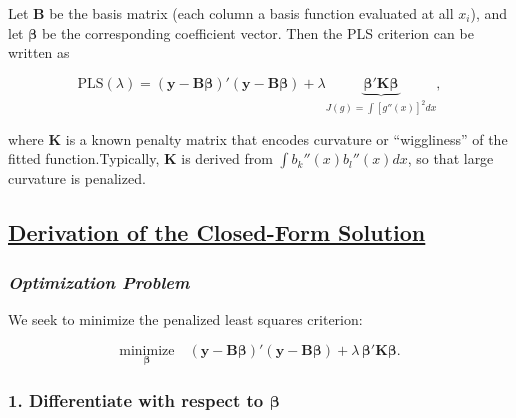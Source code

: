\documentclass[
  letterpaper,
  DIV=11,
  numbers=noendperiod]{scrreprt}
\begin{document}
Let \(\mathbf{B}\) be the basis matrix (each column a basis function
evaluated at all \(x_i\)), and let \(\boldsymbol{\beta}\) be the
corresponding coefficient vector. Then the PLS criterion can be written
as

\[
\text{PLS}(\lambda) = (\mathbf{y} - \mathbf{B}\boldsymbol{\beta})'(\mathbf{y} - \mathbf{B}\boldsymbol{\beta}) + \lambda \underbrace{\boldsymbol{\beta}'\mathbf{K}\boldsymbol{\beta}}_{J(g) = \int[g''(x)]^2dx},
\]

where \(\mathbf{K}\) is a known penalty matrix that encodes curvature or
``wiggliness'' of the fitted function.Typically, \(\mathbf{K}\) is
derived from \(\int b_k''(x)b_l''(x)dx\), so that large curvature is
penalized.

\hypertarget{derivation-of-the-closed-form-solution}{%
\subsection*{\texorpdfstring{\ul{Derivation of the Closed-Form
Solution}}{Derivation of the Closed-Form Solution}}\label{derivation-of-the-closed-form-solution}}

\hypertarget{optimization-problem}{%
\subsubsection*{\texorpdfstring{\emph{Optimization
Problem}}{Optimization Problem}}\label{optimization-problem}}

We seek to minimize the penalized least squares criterion:

\[
\underset{\boldsymbol{\beta}}{\text{minimize}} 
\quad (\mathbf{y} - \mathbf{B}\boldsymbol{\beta})'(\mathbf{y} - \mathbf{B}\boldsymbol{\beta})
+ \lambda\, \boldsymbol{\beta}'\mathbf{K}\boldsymbol{\beta}.
\]

\hypertarget{differentiate-with-respect-to-boldsymbolbeta}{%
\subsubsection*{\texorpdfstring{1. Differentiate with respect to
\(\boldsymbol{\beta}\)}{1. Differentiate with respect to \textbackslash boldsymbol\{\textbackslash beta\}}}\label{differentiate-with-respect-to-boldsymbolbeta}}
\end{document}
